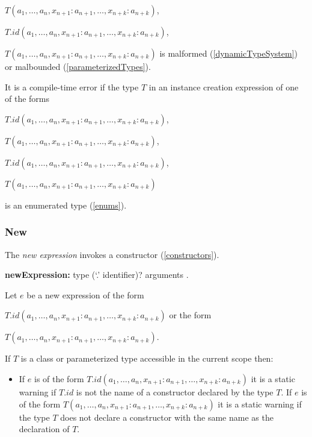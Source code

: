 \documentclass{article}
\begin{document}
\NEW{} $T(a_1, \ldots , a_n, x_{n+1}: a_{n+1}, \ldots , x_{n+k}: a_{n+k})$,

\CONST{} $T.id(a_1, \ldots , a_n, x_{n+1}: a_{n+1}, \ldots , x_{n+k}: a_{n+k})$,  

\CONST{} $T(a_1, \ldots , a_n, x_{n+1}: a_{n+1}, \ldots , x_{n+k}: a_{n+k})$ is malformed (\ref{dynamicTypeSystem}) or malbounded (\ref{parameterizedTypes}).

\LMHash{}
It is a compile-time error if the type $T$ in an instance creation expression of one of the forms 

\NEW{} $T.id(a_1, \ldots , a_n, x_{n+1}: a_{n+1}, \ldots , x_{n+k}: a_{n+k})$,  

\NEW{} $T(a_1, \ldots , a_n, x_{n+1}: a_{n+1}, \ldots , x_{n+k}: a_{n+k})$,

\CONST{} $T.id(a_1, \ldots , a_n, x_{n+1}: a_{n+1}, \ldots , x_{n+k}: a_{n+k})$,  

\CONST{} $T(a_1, \ldots , a_n, x_{n+1}: a_{n+1}, \ldots , x_{n+k}: a_{n+k})$ 

is an enumerated type (\ref{enums}).


\subsubsection{ New}

\LMHash{}
The {\em new expression} invokes a constructor (\ref{constructors}).

\begin{grammar}
{\bf newExpression:}
\NEW{} type (`{\escapegrammar .}' identifier)? arguments
.
\end{grammar}

\LMHash{}
Let $e$ be a new expression of the form  

\NEW{} $T.id(a_1, \ldots , a_n, x_{n+1}: a_{n+1}, \ldots , x_{n+k}: a_{n+k})$ or the form  

\NEW{} $T(a_1, \ldots , a_n, x_{n+1}: a_{n+1}, \ldots , x_{n+k}: a_{n+k})$. 



\LMHash{}
If $T$ is  a class or parameterized type accessible in the current scope then:
\begin{itemize}
\item
If $e$ is of the form \NEW{} $T.id(a_1, \ldots , a_n, x_{n+1}: a_{n+1}, \ldots , x_{n+k}: a_{n+k})$ it is a static warning if $T.id$ is not the name of a constructor declared by the type $T$. If $e$ is of the form  \NEW{} $T(a_1, \ldots , a_n, x_{n+1}: a_{n+1}, \ldots , x_{n+k}: a_{n+k})$ it is a static warning if the type $T$ does not declare a constructor with the same name as the declaration of $T$. 
\end{itemize}
\end{document}
